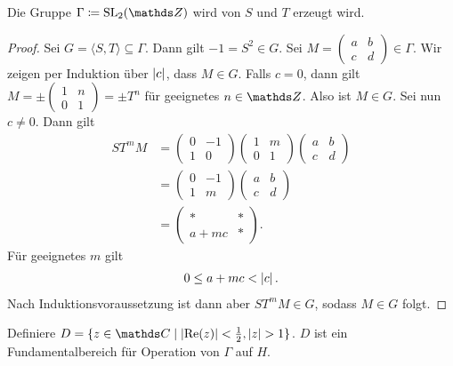 \begin{prop}
Die Gruppe $\Gamma \coloneqq \SL_2(\Z)$ wird von $S$ und $T$ erzeugt wird.
\end{prop}
\begin{proof}
Sei $G=\langle S,T \rangle \subseteq \Gamma$. Dann gilt $-1=S^2\in G$.
Sei $M=\begin{pmatrix}
a&b\\
c&d
\end{pmatrix}\in \Gamma$.
Wir zeigen per Induktion über $\left\vert c\right\vert$, dass $M\in G$.
Falls $c=0$, dann gilt $M= \pm \begin{pmatrix}
1&n\\
0&1
\end{pmatrix}=\pm T^n$
für geeignetes $n\in \Z$.
Also ist $M \in G$. Sei nun $c \not =0$. Dann gilt
\begin{align*}
ST^m M&=\begin{pmatrix}
0&-1\\
1&0
\end{pmatrix}
\begin{pmatrix}
1&m\\
0&1
\end{pmatrix}
\begin{pmatrix}
a&b\\
c&d
\end{pmatrix}\\
&=\begin{pmatrix}
0&-1\\
1&m
\end{pmatrix}
\begin{pmatrix}
a&b\\
c&d
\end{pmatrix}\\
&=\begin{pmatrix}
\ast&\ast\\
a+mc&\ast
\end{pmatrix}.
\end{align*}
Für geeignetes $m$ gilt
\begin{align*}
0 \leq a+mc <\left\vert c\right\vert.
\end{align*}
Nach Induktionsvoraussetzung ist dann aber $ST^m M \in G$, sodass $M \in G$ folgt.
\end{proof}

Definiere $D=\{z \in \C \mid \abs{\Ret(z)}<\frac{1}{2},\abs{z}>1\}$.
$D$ ist ein Fundamentalbereich für Operation von $\Gamma$ auf $H$.

